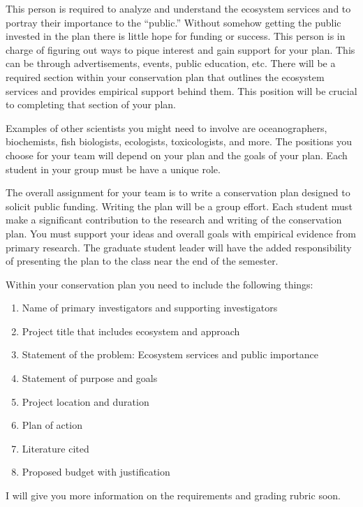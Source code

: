 \documentclass[12pt, hidelinks]{exam}
\begin{document}
This person is required to analyze and understand the ecosystem
services and to portray their importance to the ``public.'' Without
somehow getting the public invested in the plan there is little hope for
funding or success. This person is in charge of figuring out ways to
pique interest and gain support for your plan. This can be through advertisements, events,
public education, etc. There will be a required section within your
conservation plan that outlines the ecosystem services and provides
empirical support behind them. This position will be crucial to
completing that section of your plan.

Examples of other scientists you might need to involve are
oceanographers, biochemists, fish biologists, ecologists, toxicologists,
and more. The positions you choose for your team will depend on your plan and the goals of your plan. Each student in your group must be have a unique role.

The overall assignment for your team is to write a conservation plan designed to solicit public funding. Writing the plan will be a group effort. Each student must make a significant contribution
to the research and writing of the conservation plan. You must support your ideas and overall
goals with empirical evidence from primary research. The graduate student leader will have the
added responsibility of presenting the plan to the class near the end of the semester. 

Within your conservation plan you need to include the following things:

\begin{enumerate}
\def\labelenumi{\arabic{enumi}.}
\item
  Name of primary investigators and supporting investigators
\item
  Project title that includes ecosystem and approach
\item
  Statement of the problem: Ecosystem services and public importance
\item
  Statement of purpose and goals
\item
  Project location and duration
\item
  Plan of action
\item
  Literature cited
\item
  Proposed budget with justification
\end{enumerate}

I will give you more information on the requirements and grading rubric soon.
\end{document}
